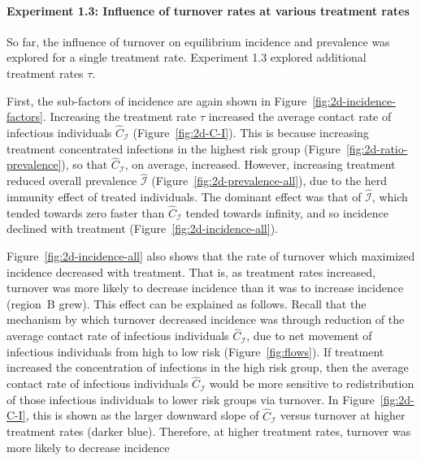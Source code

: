 \paragraph{Experiment 1.3: Influence of turnover rates at various treatment rates}
\label{p:res-turnover-2D}
So far, the influence of turnover on equilibrium incidence and prevalence
was explored for a single treatment rate.
Experiment 1.3 explored additional treatment rates $\tau$.
\par
First, the sub-factors of incidence are again shown
in Figure~\ref{fig:2d-incidence-factors}.
Increasing the treatment rate $\tau$ increased
the average contact rate of infectious individuals $\hat{C}_{\mathcal{I}}$
(Figure~\ref{fig:2d-C-I}).
This is because increasing treatment concentrated infections in the highest risk group
(Figure~\ref{fig:2d-ratio-prevalence}),
so that $\hat{C}_{\mathcal{I}}$, on average, increased.
However, increasing treatment reduced overall prevalence $\hat{\mathcal{I}}$
(Figure~\ref{fig:2d-prevalence-all}),
due to the herd immunity effect of treated individuals.
The dominant effect was that of $\hat{\mathcal{I}}$,
which tended towards zero faster than $\hat{C}_{\mathcal{I}}$ tended towards infinity,
and so incidence declined with treatment
(Figure~\ref{fig:2d-incidence-all}).
\par
Figure~\ref{fig:2d-incidence-all} also shows that
the rate of turnover which maximized incidence decreased with treatment.
That is, as treatment rates increased,
turnover was more likely to decrease incidence than it was to increase incidence
(region~B grew).
This effect can be explained as follows.
Recall that the mechanism by which turnover decreased incidence was through
reduction of the average contact rate of infectious individuals $\hat{C}_{\mathcal{I}}$,
due to net movement of infectious individuals from high to low risk
(Figure~\ref{fig:flows}).
If treatment increased the concentration of infections in the high risk group,
then the average contact rate of infectious individuals $\hat{C}_{\mathcal{I}}$
would be more sensitive to redistribution of those infectious individuals
to lower risk groups via turnover.
In Figure~\ref{fig:2d-C-I},
this is shown as the larger downward slope of $\hat{C}_{\mathcal{I}}$ versus turnover
at higher treatment rates (darker blue).
Therefore, at higher treatment rates,
turnover was more likely to decrease incidence

